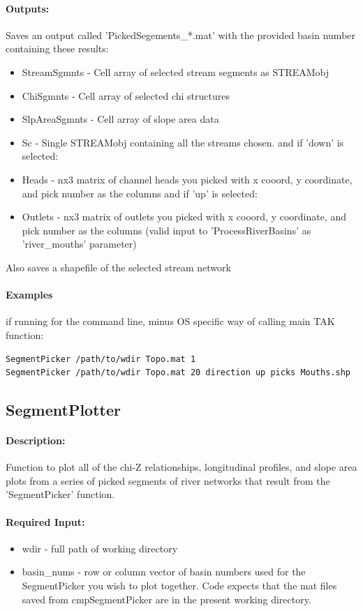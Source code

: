 \paragraph{Outputs:}
Saves an output called 'PickedSegements\_*.mat' with the provided basin number containing these results:
\begin{itemize}
\item StreamSgmnts - Cell array of selected stream segments as STREAMobj
\item ChiSgmnts - Cell array of selected chi structures 
\item SlpAreaSgmnts - Cell array of slope area data
\item Sc - Single STREAMobj containing all the streams chosen.
and if 'down' is selected:
\item Heads - nx3 matrix of channel heads you picked with x cooord, y coordinate, and pick number as the columns
and if 'up' is selected:
\item Outlets - nx3 matrix of outlets you picked with x cooord, y coordinate, and pick number as the columns (valid input to 'ProcessRiverBasins'
as 'river\_mouths' parameter)
\end{itemize}
Also saves a shapefile of the selected stream network

\paragraph{Examples} if running for the command line, minus OS specific way of calling main TAK function:
\begin{lstlisting}[language=bash]
SegmentPicker /path/to/wdir Topo.mat 1
SegmentPicker /path/to/wdir Topo.mat 20 direction up picks Mouths.shp
\end{lstlisting}


\subsection{SegmentPlotter}
\paragraph{Description:}
Function to plot all of the chi-Z relationships, longitudinal profiles, and slope area plots from a series of picked segments of river networks 
that result from the 'SegmentPicker' function. 

\paragraph{Required Input:}
\begin{itemize}
\item wdir - full path of working directory
\item basin\_nums - row or column vector of basin numbers used for the SegmentPicker you wish to plot together. Code expects that
the mat files saved from cmpSegmentPicker are in the present working directory.
\end{itemize}

